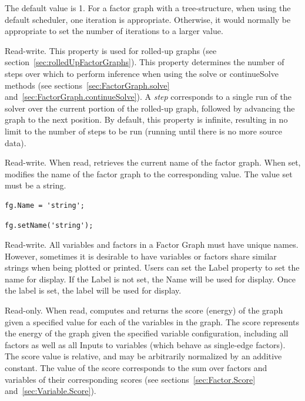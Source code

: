 The default value is 1.  For a factor graph with a tree-structure, when using the default scheduler, one iteration is appropriate.  Otherwise, it would normally be appropriate to set the number of iterations to a larger value.


Read-write.  This property is used for rolled-up graphs (see section~\ref{sec:rolledUpFactorGraphs}).  This property determines the number of steps over which to perform inference when using the solve or continueSolve methods (see sections~\ref{sec:FactorGraph.solve} and~\ref{sec:FactorGraph.continueSolve}).  A \emph{step} corresponds to a single run of the solver over the current portion of the rolled-up graph, followed by advancing the graph to the next position.  By default, this property is infinite, resulting in no limit to the number of steps to be run (running until there is no more source data).


Read-write.  When read, retrieves the current name of the factor graph.  When set, modifies the name of the factor graph to the corresponding value.  The value set must be a string.

\ifmatlab
\begin{lstlisting}
fg.Name = 'string';
\end{lstlisting}
\fi

\ifjava
\begin{lstlisting}
fg.setName('string');
\end{lstlisting}
\fi


Read-write.  All variables and factors in a Factor Graph must have unique names.  However, sometimes it is desirable to have variables or factors share similar strings when being plotted or printed.  Users can set the Label property to set the name for display.  If the Label is not set, the Name will be used for display.  Once the label is set, the label will be used for display.


\label{sec:FactorGraph.Score}

Read-only.  When read, computes and returns the score (energy) of the graph given a specified value for each of the variables in the graph.  The score represents the energy of the graph given the specified variable configuration, including all factors as well as all Inputs to variables (which behave as single-edge factors).  The score value is relative, and may be arbitrarily normalized by an additive constant.  The value of the score corresponds to the sum over factors and variables of their corresponding scores (see sections~\ref{sec:Factor.Score} and~\ref{sec:Variable.Score}).

